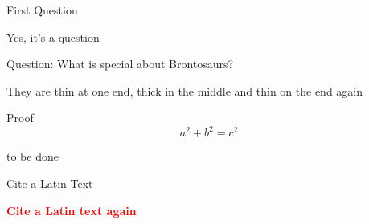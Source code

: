 \documentclass{scrartcl}
\begin{document}
\begin{exercise}
  First Question
\end{exercise}
\begin{solution}
  Yes, it's a question
\end{solution}

\begin{exercise}[print=false,use]
  Question: What is special about Brontosaurs?
\end{exercise}
\begin{solution}
  They are thin at one end, thick in the middle and thin on the end again
\end{solution}

\begin{exercise}
  Proof 
\begin{equation}
  a^2 + b^2 = c^2
\end{equation}
\end{exercise}
\begin{solution}
  to be done
\end{solution}

\begin{exercise}
  Cite a Latin Text
\end{exercise}
\begin{solution}
  \textcolor{blue}{\blindtext}
\end{solution}

\begin{exercise}
  \textcolor{red}{\textbf{Cite a Latin text again}}
\end{exercise}

\printsolutions*
\end{document}
